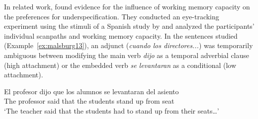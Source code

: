 \documentclass{cambridge7A}\usepackage[]{graphicx}\usepackage[]{color}
\begin{document}




In related work, \cite{MalsburgVasishth2013} found evidence for the influence of working memory capacity on the preferences for underspecification.
They conducted an eye-tracking experiment using the stimuli of a Spanish study by \cite{MeseguerCarreirasClifton2002} and analyzed the participants' individual scanpaths \citep{MalsburgVasishth2011} and working memory capacity.
In the sentences studied (Example~\ref{ex:malsburg13}), an adjunct (\textit{cuando los directores...}) was temporarily ambiguous between modifying the main verb \textit{dijo} as a temporal adverbial clause (high attachment) or the embedded verb \textit{se levantaran} as a conditional (low attachment). 

\begin{exe}
\ex\label{ex:malsburg13preamble} 
\gll El profesor dijo que los alumnos {se levantaran} del asiento\\
     The professor said that the students {stand up} from seat \\
\glt `The teacher said that the students had to stand up from their seats\dots'
\end{exe}
\end{document}
